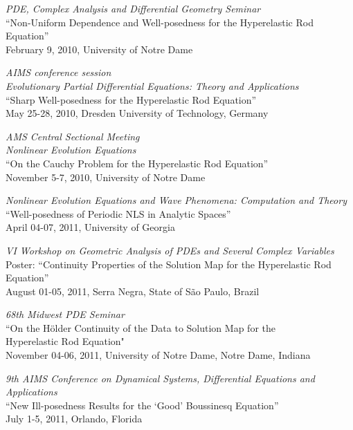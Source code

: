\documentclass[11pt,oneside]{amsart}
\renewcommand{\section}[2]%
{\vspace{0.7cm}%
\hspace{0in}%
\marginpar{\scshape #1}#2}
\begin{document}
\section{Invited Talks}
\vspace{-0.4cm}
\begin{compactenum}[1)]
\item \textit{PDE, Complex Analysis and Differential Geometry Seminar} \\
``Non-Uniform Dependence and Well-posedness for the Hyperelastic Rod Equation'' \\
February 9, 2010, University of 
Notre Dame
\\
\item \textit{AIMS conference session \\ 
Evolutionary Partial Differential Equations: Theory and Applications} \\
``Sharp Well-posedness for the Hyperelastic Rod Equation''\\ 
May 25-28, 2010, Dresden University of Technology, Germany  \\

\item \textit{AMS Central Sectional Meeting \\ Nonlinear Evolution Equations} \\
``On the Cauchy Problem for the Hyperelastic Rod Equation'' \\
November 5-7, 2010, University of Notre Dame \\

\item \textit{Nonlinear Evolution Equations and Wave Phenomena: Computation and Theory} \\
``Well-posedness of Periodic NLS in Analytic Spaces'' \\
April 04-07, 2011, University of Georgia \\

\item \textit{VI Workshop on Geometric Analysis of PDEs and Several Complex Variables}
\\
Poster: ``Continuity Properties of the Solution Map for the Hyperelastic Rod Equation''
\\
August 01-05, 2011, Serra Negra, State of S{\~a}o Paulo, Brazil \\

\item \textit{68th Midwest PDE Seminar}
\\
``On the H\"older Continuity of the Data to Solution Map for the \\ Hyperelastic
Rod Equation"
\\
November 04-06, 2011, University of Notre Dame, Notre Dame, Indiana \\

\item \textit{9th AIMS Conference on Dynamical Systems, 
Differential Equations and Applications
}
\\
``New Ill-posedness Results for the `Good' Boussinesq Equation'' 
\\
July 1-5, 2011, Orlando, Florida

\end{compactenum}
\end{document}
